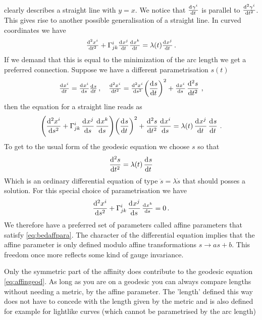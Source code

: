 clearly describes a straight line with $y=x$.
We notice that $\od{\tensor{\gamma}{^i}}{t}$ is parallel to
$\od[2]{\tensor{\gamma}{^i}}{t}$. This gives rise to another possible
generalisation of a straight line.
In curved coordinates we have 
\begin{equation}
\od[2]{\tensor{x}{^i}}{t}+\affin{i}{j}{k}\od{\tensor{x}{^j}}{t}\od{\tensor{x}{^k}}{t}
=\lambda(t)\od{\tensor{x}{^j}}{t}\,.
\end{equation}
If we demand that this is equal to the minimization of the arc length we get a
preferred connection. 
Suppose we have a different parametrisation $s(t)$
\begin{equation}
\od{\tensor{x}{^i}}{t}=\od{\tensor{x}{^i}}{s}\od{s}{t}\,,\quad
\od[2]{\tensor{x}{^i}}{t}=\od[2]{\tensor{x}{^i}}{s}\left(\dod{s}{t}\right)^2
+\od{\tensor{x}{^i}}{s}\dod[2]{s}{t}\, ,
\end{equation} 
then the equation for a straight line reads as
\begin{equation}
\left(\dod[2]{\tensor{x}{^i}}{s}+\affin{i}{j}{k}\dod{\tensor{x}{^j}}{s}\dod{\tensor{x}{^k}}{s}
\right)\left(\dod{s}{t}\right)^2+\dod[2]{s}{t}\dod{\tensor{x}{^i}}{s}
=\lambda(t)\dod{\tensor{x}{^j}}{t}\dod{s}{t}\,.
\end{equation}
To get to the usual form of the geodesic equation we choose $s$ so that
\begin{equation}
\dod[2]{s}{t}=\lambda(t)\dod{s}{t}\label{eq:bedaffpara}
\end{equation}
Which is an ordinary differential equation of type $\ddot{s}=\lambda\dot{s}$
that should posses a solution. 
For this special choice of parametrisation we have
\begin{equation}
\dod[2]{\tensor{x}{^i}}{s}+\affin{i}{j}{k}\dod{\tensor{x}{^j}}{s}\od{\tensor{x}{^k}}{s}
=0\,.\label{eq:affingeod}
\end{equation}
We therefore have a preferred set of parameters
called affine parameters that satisfy \eqref{eq:bedaffpara}. The character
of the differential equation implies that the affine parameter is only
defined modulo affine transformations $s\to as+b$. This freedom once more
reflects some kind of gauge invariance.
\begin{remark}
Only the symmetric part of the affinity does contribute to
the geodesic equation \eqref{eq:affingeod}. As long as you are on a geodesic you
can always compare lengths without needing a metric, by the affine parameter.
The 'length' defined this way does not have to concede with the length given by
the metric and is also defined for example for lightlike curves (which cannot
be parametrised by the arc length)
\end{remark}
